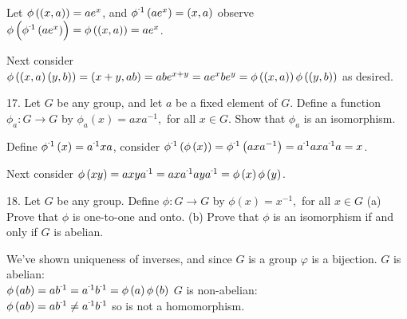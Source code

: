 \begin{mdframed}[style=darkAnswer,frametitle={Joe Starr}]
Let $\phi\left(\left(x,a\right)\right)=ae^x$, and $\pofinv{ae^x}=\lrp{x,a}$ observe 
$\pof{\pofinv{ae^x}}=\pof{\lrp{x,a}}=ae^x$.

Next consider $\phi\left(\left(x,a\right)\left(y,b\right)\right)= \left(x+y,ab\right)=abe^{x+y}
=ae^xbe^y=\phi\left(\left(x,a\right)\right)\phi\left(\left(y,b\right)\right)$ as desired. 

\end{mdframed}
\newpage
\begin{mdframed}[style=darkQuesion]
17. Let $G$ be any group, and let $a$ be a fixed element of $G .$ Define a function $\phi_{a}: G \rightarrow G$
by $\phi_{a}(x)=a x a^{-1},$ for all $x \in G .$ Show that $\phi_{a}$ is an isomorphism.
\end{mdframed}
\begin{mdframed}[style=darkAnswer,frametitle={Joe Starr}]
Define $\pofinv{x}=\inv{a}xa$, consider $\pofinv{\pof{x}}=\pofinv{a x a^{-1}}=\inv{a}a x \inv{a}a=x$.

Next consider $\pof{xy}= a xy \inv{a}=ax\inv{a}ay\inv{a}=\pof{x}\pof{y}$.
\end{mdframed}
\newpage
\begin{mdframed}[style=darkQuesion]
18. Let $G$ be any group. Define $\phi: G \rightarrow G$ by $\phi(x)=x^{-1},$ for all $x \in G$
(a) Prove that $\phi$ is one-to-one and onto.
(b) Prove that $\phi$ is an isomorphism if and only if $G$ is abelian.
\end{mdframed}
\begin{mdframed}[style=darkAnswer,frametitle={Joe Starr}]
We've shown uniqueness of inverses, and since $G$ is a group $\varphi$ is a 
bijection. 
$G$ is abelian: \\
$\pof{ab}=\inv{ab}=\inv{a}\inv{b}=\pof{a}\pof{b}$
$G$ is non-abelian:\\
$\pof{ab}=\inv{ab}\neq\inv{a}\inv{b}$ so is not a homomorphism. 

\end{mdframed}
